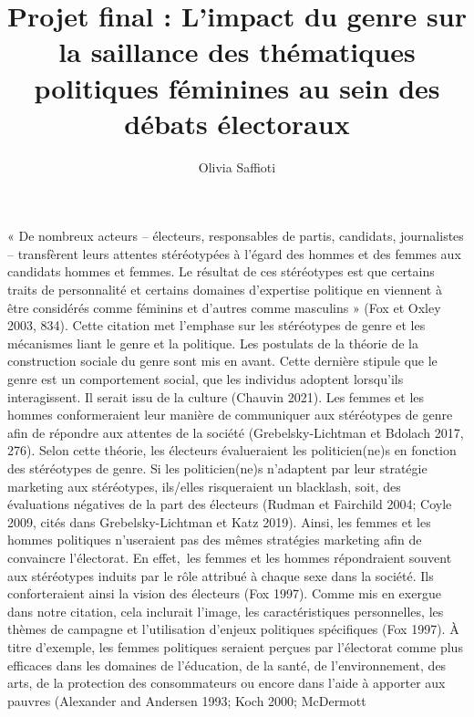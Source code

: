 \documentclass[
  letterpaper,
  DIV=11,
  numbers=noendperiod]{scrartcl}
\title{Projet final : L'impact du genre sur la saillance des thématiques
politiques féminines au sein des débats électoraux}
\author{Olivia Saffioti}
\date{}
\begin{document}
\maketitle
\ifdefined\Shaded\renewenvironment{Shaded}{\begin{tcolorbox}[sharp corners, enhanced, boxrule=0pt, interior hidden, borderline west={3pt}{0pt}{shadecolor}, frame hidden, breakable]}{\end{tcolorbox}}\fi

« De nombreux acteurs -- électeurs, responsables de partis, candidats,
journalistes -- transfèrent leurs attentes stéréotypées à l'égard des
hommes et des femmes aux candidats hommes et femmes. Le résultat de ces
stéréotypes est que certains traits de personnalité et certains domaines
d'expertise politique en viennent à être considérés comme féminins et
d'autres comme masculins » (Fox et Oxley 2003, 834). Cette citation met
l'emphase sur les stéréotypes de genre et les mécanismes liant le genre
et la politique. Les postulats de la théorie de la construction sociale
du genre sont mis en avant. Cette dernière stipule que le genre est un
comportement social, que les individus adoptent lorsqu'ils
interagissent. Il serait issu de la culture (Chauvin 2021). Les femmes
et les hommes conformeraient leur manière de communiquer aux stéréotypes
de genre afin de répondre aux attentes de la société (Grebelsky-Lichtman
et Bdolach 2017, 276). Selon cette théorie, les électeurs évalueraient
les politicien(ne)s en fonction des stéréotypes de genre. Si les
politicien(ne)s n'adaptent par leur stratégie marketing aux stéréotypes,
ils/elles risqueraient un blacklash, soit, des évaluations négatives de
la part des électeurs (Rudman et Fairchild 2004; Coyle 2009, cités dans
Grebelsky-Lichtman et Katz 2019). Ainsi, les femmes et les hommes
politiques n'useraient pas des mêmes stratégies marketing afin de
convaincre l'électorat. En effet,~les femmes et les hommes répondraient
souvent aux stéréotypes induits par le rôle attribué à chaque sexe dans
la société. Ils conforteraient ainsi la vision des électeurs (Fox 1997).
Comme mis en exergue dans notre citation, cela inclurait l'image, les
caractéristiques personnelles, les thèmes de campagne et l'utilisation
d'enjeux politiques spécifiques (Fox 1997). À titre d'exemple, les
femmes politiques seraient perçues par l'électorat comme plus efficaces
dans les domaines de l'éducation, de la santé, de l'environnement, des
arts, de la protection des consommateurs ou encore dans l'aide à
apporter aux pauvres (Alexander and Andersen 1993; Koch 2000; McDermott
\end{document}
